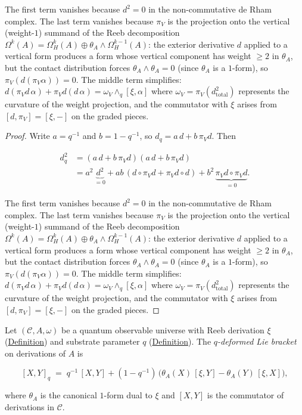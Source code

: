 \begin{proposition}
The first term vanishes because $d^2 = 0$ in the non-commutative
de Rham complex.  The last term vanishes because $\pi_V$ is the projection onto the
vertical (weight-$1$) summand of the Reeb decomposition
$\Omega^k(A) = \Omega^k_H(A) \oplus \theta_A \wedge \Omega^{k-1}_H(A)$:
the exterior derivative $d$ applied to a vertical form produces a form
whose vertical component has weight $\geq 2$ in $\theta_A$, but the
contact distribution forces $\theta_A \wedge \theta_A = 0$
(since $\theta_A$ is a $1$-form), so $\pi_V(d(\pi_V\alpha)) = 0$.
The middle term simplifies:
$d(\pi_V d\,\alpha) + \pi_V d(d\,\alpha) = \omega_V \wedge_q [\xi, \alpha]$
where $\omega_V = \pi_V(d^2_{\text{total}})$ represents the curvature
of the weight projection, and the commutator with $\xi$ arises
from $[d, \pi_V] = [\xi, {-}]$ on the graded pieces.
\end{proposition}
\begin{proof}
Write $a = q^{-1}$ and $b = 1 - q^{-1}$, so $d_q = a\,d + b\,\pi_V d$.
Then

\begin{align*}
  d_q^2
  &= (a\,d + b\,\pi_V d)(a\,d + b\,\pi_V d) \\
  &= a^2\,\underbrace{d^2}_{= 0}
     + ab\,(d \circ \pi_V d + \pi_V d \circ d)
     + b^2\,\underbrace{\pi_V d \circ \pi_V d}_{= 0}.
\end{align*}

The first term vanishes because $d^2 = 0$ in the non-commutative
de Rham complex.  The last term vanishes because $\pi_V$ is the projection onto the
vertical (weight-$1$) summand of the Reeb decomposition
$\Omega^k(A) = \Omega^k_H(A) \oplus \theta_A \wedge \Omega^{k-1}_H(A)$:
the exterior derivative $d$ applied to a vertical form produces a form
whose vertical component has weight $\geq 2$ in $\theta_A$, but the
contact distribution forces $\theta_A \wedge \theta_A = 0$
(since $\theta_A$ is a $1$-form), so $\pi_V(d(\pi_V\alpha)) = 0$.
The middle term simplifies:
$d(\pi_V d\,\alpha) + \pi_V d(d\,\alpha) = \omega_V \wedge_q [\xi, \alpha]$
where $\omega_V = \pi_V(d^2_{\text{total}})$ represents the curvature
of the weight projection, and the commutator with $\xi$ arises
from $[d, \pi_V] = [\xi, {-}]$ on the graded pieces.
\end{proof}

\begin{definition}
  \label{def:categorical-q-lie-bracket}
Let $(\mathcal{C}, A, \omega)$ be a quantum observable universe with
Reeb derivation $\xi$ (\hyperref[def:categorical-reeb]{Definition}) and
substrate parameter $q$ (\hyperref[def:substrate-parameter]{Definition}).
The \emph{$q$-deformed Lie bracket} on derivations of $A$ is

\[
[X, Y]_q \;=\; q^{-1}\,[X, Y]
  + (1 - q^{-1})\,\bigl(\theta_A(X)\,[\xi, Y]
                        - \theta_A(Y)\,[\xi, X]\bigr),
\]

where $\theta_A$ is the canonical $1$-form dual to $\xi$ and
$[X, Y]$ is the commutator of derivations in $\mathcal{C}$.
\end{definition}

